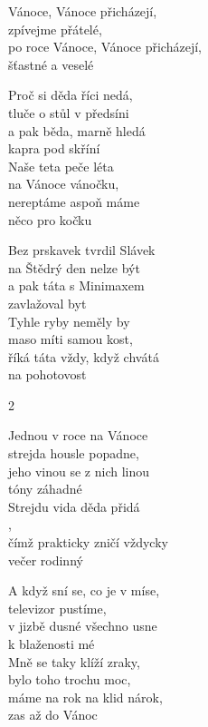 
\cho{}
Vánoce, Vánoce přicházejí,\\
zpívejme přátelé,\\ 
po roce Vánoce, Vánoce přicházejí,\\
šťastné a veselé

\ve{}
Proč si děda říci nedá,\\
tluče o stůl v předsíni\\
a pak běda, marně hledá\\
kapra pod skříní\\
Naše teta peče léta\\
na Vánoce vánočku,\\
nereptáme aspoň máme\\
něco pro kočku

\cho{}

\ve{}
Bez prskavek tvrdil Slávek\\
na Štědrý den nelze být\\
a pak táta s Minimaxem\\
zavlažoval byt\\
Tyhle ryby neměly by\\ 
maso míti samou kost,\\
říká táta vždy, když chvátá\\
na pohotovost

\begin{multicols}{2}

\cho{}

\ve{}
Jednou v roce na Vánoce\\
strejda housle popadne,\\
jeho vinou se z nich linou\\
tóny záhadné\\
Strejdu vida děda přidá\\
,\\
čímž prakticky zničí vždycky\\
večer rodinný

\cho{}

\ve{}
A když sní se, co je v míse,\\
televizor pustíme,\\
v jizbě dusné všechno usne\\
k blaženosti mé\\
Mně se taky klíží zraky,\\
bylo toho trochu moc,\\
máme na rok na klid nárok,\\
zas až do Vánoc

\cho{}

\end{multicols}

\esong{}







